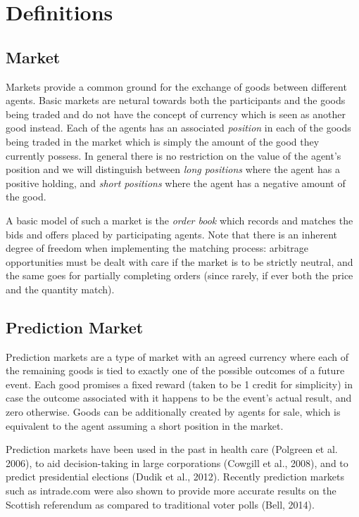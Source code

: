 \documentclass[bsc,frontabs,twoside,singlespacing,parskip,deptreport]{infthesis}     %
\begin{document}
\chapter{Definitions}

\section{Market}
	Markets provide a common ground for the exchange of goods between different agents. Basic markets are netural towards both the participants and the goods being traded and do not have the concept of currency which is seen as another good instead. Each of the agents has an associated {\em position} in each of the goods being traded in the market which is simply the amount of the good they currently possess. In general there is no restriction on the value of the agent's position and we will distinguish between {\em long positions} where the agent has a positive holding, and {\em short positions} where the agent has a negative amount of the good. 

	A basic model of such a market is the {\em order book} which records and matches the bids and offers placed by participating agents. Note that there is an inherent degree of freedom when implementing the matching process: arbitrage opportunities must be dealt with care if the market is to be strictly neutral, and the same goes for partially completing orders (since rarely, if ever both the price and the quantity match). 

\section{Prediction Market}
	Prediction markets are a type of market with an agreed currency where each of the remaining goods is tied to exactly one of the possible outcomes of a future event. Each good promises a fixed reward (taken to be 1 credit for simplicity) in case the outcome associated with it happens to be the event's actual result, and zero otherwise. Goods can be additionally created by agents for sale, which is equivalent to the agent assuming a short position in the market. 

	Prediction markets have been used in the past in health care (Polgreen et al. 2006), to aid decision-taking in large corporations (Cowgill et al., 2008), and to predict presidential elections (Dudik et al., 2012). Recently prediction markets such as intrade.com were also shown to provide more accurate results on the Scottish referendum as compared to traditional voter polls (Bell, 2014).
\end{document}
